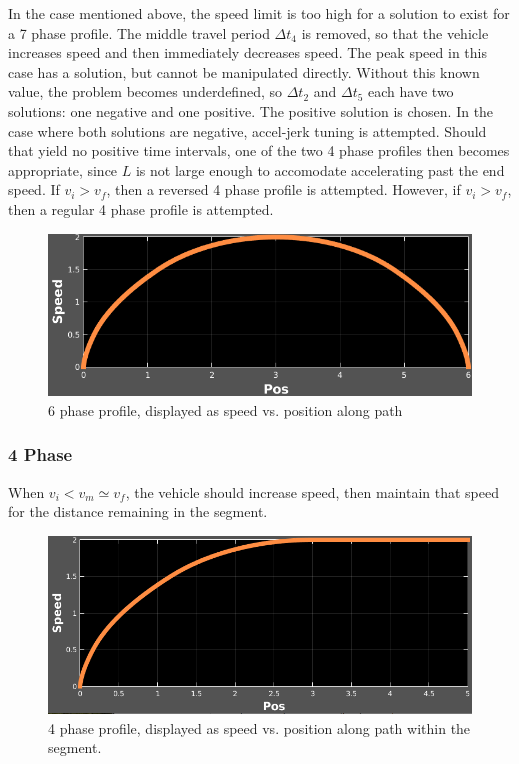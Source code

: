 \documentclass[letterpaper, 10 pt, conference]{ieeeconf}  %
\begin{document}
In the case mentioned above, the speed limit is too high for a solution to exist for a 7 phase profile.
The middle travel period $\Delta t_4$ is removed, so that the vehicle increases speed and then immediately decreases speed. 
The peak speed in this case has a solution, but cannot be manipulated directly.
Without this known value, the problem becomes underdefined, so $\Delta t_2$ and $\Delta t_5$ each have two solutions: one negative and one positive.
The positive solution is chosen.
In the case where both solutions are negative, accel-jerk tuning is attempted. 
Should that yield no positive time intervals, one of the two 4 phase profiles then becomes appropriate, since $L$ is not large enough to accomodate accelerating past the end speed.
If $v_i > v_f$, then a reversed 4 phase profile is attempted.
However, if $v_i > v_f$, then a regular 4 phase profile is attempted.

\begin{figure}[thpb]
  \centering
  \includegraphics[width=0.7\columnwidth]{graphics/6phase_v(s).png}
  \caption{6 phase profile, displayed as speed vs. position along path}
  \label{fig:6phaseprofile}
\end{figure}

\subsubsection{4 Phase} \label{sec:4phase}

When $v_i < v_m \simeq v_f$, the vehicle should increase speed, then maintain that speed for the distance remaining in the segment.

\begin{figure}[thpb]
  \centering
  \includegraphics[width=0.7\columnwidth]{graphics/4phase_v(s).png}
  \caption{4 phase profile, displayed as speed vs. position along path within the segment.}
  \label{fig:4phaseprofile}
\end{figure}
\end{document}
